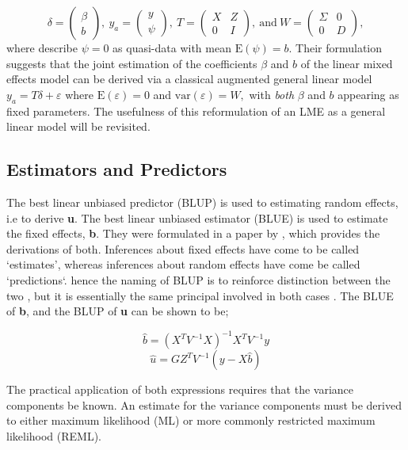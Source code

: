 \documentclass[12pt, a4paper]{report}
\theoremstyle{plain}
\theoremstyle{definition}
\theoremstyle{remark}
\begin{document}
\[
\delta = \begin{pmatrix}
\beta \\ b
\end{pmatrix},
\ y_{a} = \begin{pmatrix}
y \\ \psi
\end{pmatrix},
\ T = \begin{pmatrix}
X & Z  \\
0 & I
\end{pmatrix},
\ \textrm{and} \ W = \begin{pmatrix}
\Sigma & 0  \\
0 &  D
\end{pmatrix},
\]
where \cite{Lee:Neld:Pawi:2006} describe $\psi = 0$ as quasi-data with mean $\mathrm{E}(\psi) = b.$ Their formulation suggests that the joint estimation of the coefficients $\beta$ and $b$ of the linear mixed effects model can be derived via a classical augmented general linear model $y_{a} = T\delta + \varepsilon$ where $\mathrm{E}(\varepsilon) = 0$ and $\mathrm{var}(\varepsilon) = W,$ with \emph{both} $\beta$ and $b$ appearing as fixed parameters. The usefulness of this reformulation of an LME as a general linear model will be revisited.

\subsection{Estimators and Predictors}

The best linear unbiased predictor (BLUP) is used to estimating
random effects, i.e to derive \textbf{u}. The best linear unbiased
estimator (BLUE) is used to estimate the fixed effects,
\textbf{b}. They were formulated in a paper by \cite{Henderson59},
which provides the derivations of both. Inferences about fixed
effects have come to be called `estimates', whereas inferences
about random effects have come be called `predictions`. hence the
naming of BLUP is to reinforce distinction between the two , but
it is essentially the same principal involved in both cases
\citep{Robinson}. The BLUE of \textbf{b}, and the BLUP of
\textbf{u} can be shown to be;

\begin{equation}
\hat{b} = (X^{T}V^{-1}X)^{-1}X^{T}V^{-1}y
\end{equation}
\begin{equation}
\hat{u} = GZ^{T}V^{-1}(y-X\hat{b})
\end{equation}

The practical application of both expressions requires that the
variance components be known. An estimate for the variance
components must be derived to  either maximum likelihood (ML) or
more commonly restricted maximum likelihood (REML).
\end{document}
